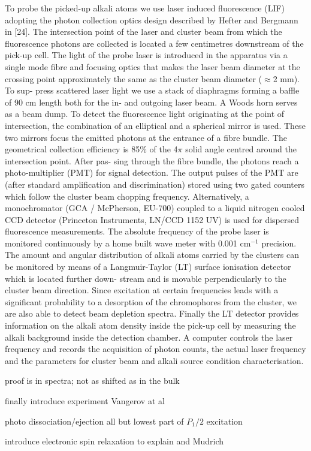 		To probe the picked-up alkali atoms we use laser induced fluorescence (LIF) adopting the photon collection optics design described by Hefter and Bergmann in [24]. The intersection point of the laser and cluster beam from which the fluorescence photons are collected is located a few centimetres downstream of the pick-up cell. The light of the probe laser is introduced in the apparatus via a single mode fibre and focusing optics that makes the laser beam diameter at the crossing point approximately the same as the cluster beam diameter ($\approx$2 mm). To sup- press scattered laser light we use a stack of diaphragms forming a baffle of 90 cm length both for the in- and outgoing laser beam. A Woods horn serves as a beam dump. To detect the fluorescence light originating at the point of intersection, the combination of an elliptical and a spherical mirror is used. These two mirrors focus the emitted photons at the entrance of a fibre bundle. The geometrical collection efficiency is 85\% of the 4$\pi$ solid angle centred around the intersection point. After pas- sing through the fibre bundle, the photons reach a photo-multiplier (PMT) for signal detection. The output pulses of the PMT are (after standard amplification and discrimination) stored using two gated counters which follow the cluster beam chopping frequency. Alternatively, a monochromator (GCA / McPherson, EU-700) coupled to a liquid nitrogen cooled CCD detector (Princeton Instruments, LN/CCD 1152 UV) is used for dispersed fluorescence measurements. The absolute frequency of the probe laser is monitored continuously by a home built wave meter with 0.001 cm$^{-1}$ precision. The amount and angular distribution of alkali atoms carried by the clusters can be monitored by means of a Langmuir-Taylor (LT) surface ionisation detector which is located further down- stream and is movable perpendicularly to the cluster beam direction. Since excitation at certain frequencies leads with a significant probability to a desorption of the chromophores from the cluster, we are also able to detect beam depletion spectra. Finally the LT detector provides information on the alkali atom density inside the pick-up cell by measuring the alkali background inside the detection chamber. A computer controls the laser frequency and records the acquisition of photon counts, the actual laser frequency and the parameters for cluster beam and alkali source condition characterisation.


proof is in spectra; not as shifted as in the bulk


finally introduce experiment Vangerov at al 

photo dissociation/ejection all but lowest part of $P_1/2$ excitation

introduce electronic spin relaxation to explain
and Mudrich
